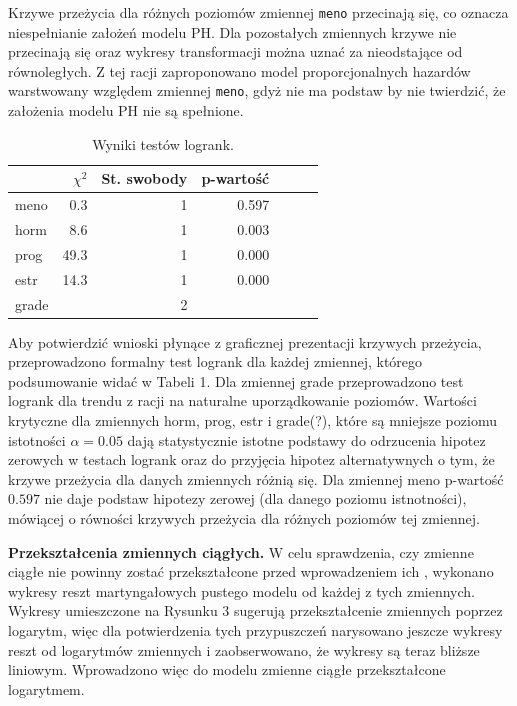\documentclass[]{article}
\begin{document}
Krzywe przeżycia dla różnych poziomów zmiennej \texttt{meno} przecinają
się, co oznacza niespełnianie założeń modelu PH. Dla pozostałych
zmiennych krzywe nie przecinają się oraz wykresy transformacji można
uznać za nieodstające od równoległych. Z tej racji zaproponowano model
proporcjonalnych hazardów warstwowany względem zmiennej \texttt{meno},
gdyż nie ma podstaw by nie twierdzić, że założenia modelu PH nie są
spełnione.

\begin{table}
\vspace{-20pt}
\caption{ Wyniki testów logrank. }
\begin{tabular}{lrrrrrr}
\toprule%
\ &$\chi^2$&St. swobody&p-wartość\\ \toprule meno&0.3&1&0.597\\ horm&8.6&1&0.003\\ prog&49.3&1&0.000\\ estr&14.3&1&0.000\\ grade&&2&\\  \bottomrule
\end{tabular}
\vspace{-7.5pt}
\end{table}

Aby potwierdzić wnioski płynące z graficznej prezentacji krzywych
przeżycia, przeprowadzono formalny test logrank dla każdej zmiennej,
którego podsumowanie widać w Tabeli 1. Dla zmiennej \textsf{grade}
przeprowadzono test logrank dla trendu z racji na naturalne
uporządkowanie poziomów. Wartości krytyczne dla zmiennych \textsf{horm},
\textsf{prog}, \textsf{estr} i \textsf{grade}(?), które są mniejsze
 poziomu istotności \(\alpha=0.05\) dają
statystycznie istotne podstawy do odrzucenia hipotez zerowych w testach
logrank oraz do przyjęcia hipotez alternatywnych o tym, że krzywe
przeżycia dla danych zmiennych różnią się. Dla zmiennej \textsf{meno}
p-wartość \(0.597\) nie daje podstaw  hipotezy
zerowej (dla danego poziomu istnotności), mówiącej o równości krzywych
przeżycia dla różnych poziomów tej zmiennej.

\newpage
\textbf{Przekształcenia zmiennych ciągłych.} \newline
W celu sprawdzenia, czy zmienne ciągłe nie powinny zostać przekształcone
przed wprowadzeniem ich , wykonano wykresy reszt
martyngałowych pustego modelu od każdej z tych zmiennych. Wykresy
umieszczone na Rysunku 3 sugerują przekształcenie zmiennych poprzez
logarytm, więc dla potwierdzenia tych przypuszczeń narysowano jeszcze
wykresy reszt od logarytmów zmiennych i zaobserwowano, że wykresy są
teraz bliższe liniowym. Wprowadzono więc do modelu zmienne ciągłe
przekształcone logarytmem.
\end{document}
